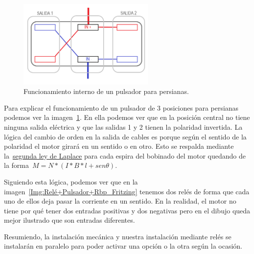 \begin{figure}[h]
    \centering
    \includegraphics[width=0.6\textwidth]{img/Diagramas/PulsadorInterno.png}
    \caption{Funcionamiento interno de un pulsador para persianas.} \label{img:PulsadorInterno}
\end{figure}


Para explicar el funcionamiento de un pulsador de 3 posiciones para persianas podemos ver la imagen~\ref{img:PulsadorInterno}. En ella podemos ver que en la posición central no tiene ninguna salida eléctrica y que las salidas 1 y 2 tienen la polaridad invertida. La lógica del cambio de orden en la salida de cables es porque según el sentido de la polaridad el motor girará en un sentido o en otro. Esto se respalda mediante la~\href{https://fisica.laguia2000.com/dinamica-clasica/fuerzas/ley-de-laplace-fuerza-ejercida-sobre-un-conductor}{segunda ley de Laplace} para cada espira del bobinado del motor quedando de la forma~\href{http://www.uco.es/grupos/giie/cirweb/teoria/tema_11/tema_11_01.pdf}{$M=N*(I*B*l+sen\theta)$}.

Siguiendo esta lógica, podemos ver que en la imagen~\ref{Img:Relé+Pulsador+Rbp_Fritzing} tenemos dos relés de forma que cada uno de ellos deja pasar la corriente en un sentido. En la realidad, el motor no tiene por qué tener dos entradas positivas y dos negativas pero en el dibujo queda mejor ilustrado que son entradas diferentes.

Resumiendo, la instalación mecánica y nuestra instalación mediante relés se instalarán en paralelo para poder activar una opción o la otra según la ocasión.

